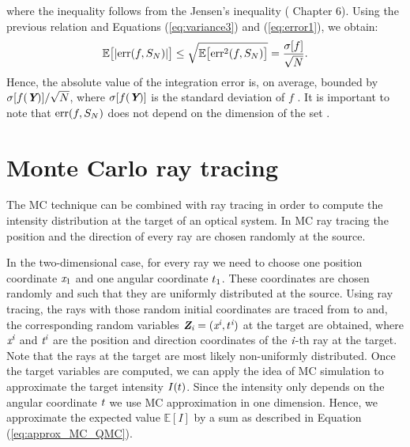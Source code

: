 where the inequality follows from the Jensen's inequality (\cite{williams1991probability} Chapter $6$).
Using the previous relation and Equations (\ref{eq:variance3}) and (\ref{eq:error1}), we obtain:
\begin{equation}\label{eq:mean_error}
\mathbb{E}\big[|\textrm{err}(f, S_{N})|\big]\leq
\sqrt{\mathbb{E}\big[\textrm{err}^2(f, S_{N})\big]} = \frac{\sigma[f]}{\sqrt{N}}.
\end{equation}
Hence, the absolute value of the integration error is, on average, bounded by $\sigma[f(\textit{\textbf{Y}})]/\sqrt{N}$, where $\sigma[f(\textit{\textbf{Y}})]$ is the standard deviation of $f$ \cite{leobacher2014introduction}. It is important to note that $\textrm{err}(f, S_{N})$ does not depend on the dimension of the set .
\section{Monte Carlo ray tracing}
The MC technique can be combined with ray tracing in order to compute the intensity distribution at the target of an optical system.
In MC ray tracing the position and the direction of every ray are chosen randomly at the source. 

In the two-dimensional case, for every ray we need to choose one position coordinate $\textit{x}_1$ and one angular coordinate $t_1$. These coordinates are chosen randomly and such that they are uniformly distributed at the source. 
Using ray tracing, the rays with those random initial coordinates are traced from  to  and, the corresponding random variables $\textit{\textbf{Z}}_{\textit{i}}=(\textit{x}^{\textit{i}},t^{\textit{i}})$ at the target are obtained, where $\textit{x}^{\textit{i}}$ and $\textit{t}^{\textit{i}}$ are the position and direction coordinates of the $\textit{i}$-th ray at the target. Note that the rays at the target are most likely non-uniformly distributed. Once the target variables are computed, we can apply the idea of MC simulation to approximate the target intensity $I(t)$. Since the intensity only depends on the angular coordinate $t$ we use MC approximation in one dimension. Hence, we approximate the expected value $\mathbb{E}[I]$ by a sum as described in Equation (\ref{eq:approx_MC_QMC}). 

